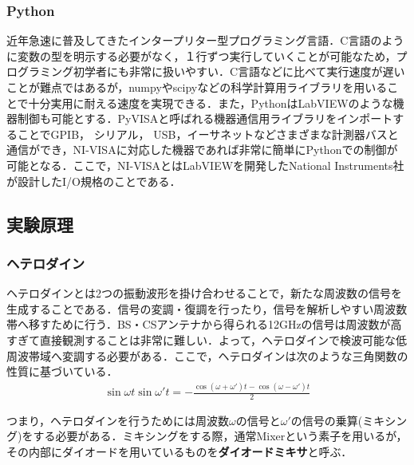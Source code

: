 \documentclass[a4j,10pt,oneside,openany]{jsbook}
\begin{document}
{\subsubsection{Python}
近年急速に普及してきたインタープリター型プログラミング言語．C言語のように変数の型を明示する必要がなく，１行ずつ実行していくことが可能なため，プログラミング初学者にも非常に扱いやすい．C言語などに比べて実行速度が遅いことが難点ではあるが，numpyやscipyなどの科学計算用ライブラリを用いることで十分実用に耐える速度を実現できる．また，PythonはLabVIEWのような機器制御も可能とする．PyVISAと呼ばれる機器通信用ライブラリをインポートすることでGPIB， シリアル， USB，イーサネットなどさまざまな計測器バスと通信ができ，NI-VISAに対応した機器であれば非常に簡単にPythonでの制御が可能となる．ここで，NI-VISAとはLabVIEWを開発したNational Instruments社が設計したI/O規格のことである．

\subsection{実験原理}
\subsubsection{ヘテロダイン}
ヘテロダインとは2つの振動波形を掛け合わせることで，新たな周波数の信号を生成することである．信号の変調・復調を行ったり，信号を解析しやすい周波数帯へ移すために行う．BS・CSアンテナから得られる12GHzの信号は周波数が高すぎて直接観測することは非常に難しい．よって，ヘテロダインで検波可能な低周波帯域へ変調する必要がある．ここで，ヘテロダインは次のような三角関数の性質に基づいている．
\begin{align}
  \sin\omega t \sin\omega' t = -\frac{\cos(\omega+\omega')t-\cos(\omega-\omega')t}{2} \label{eq:hetero}
\end{align}

つまり，ヘテロダインを行うためには周波数$\omega$の信号と$\omega'$の信号の乗算(ミキシング)をする必要がある．ミキシングをする際，通常Mixerという素子を用いるが，その内部にダイオードを用いているものを\textbf{ダイオードミキサ}と呼ぶ．

}
\end{document}
